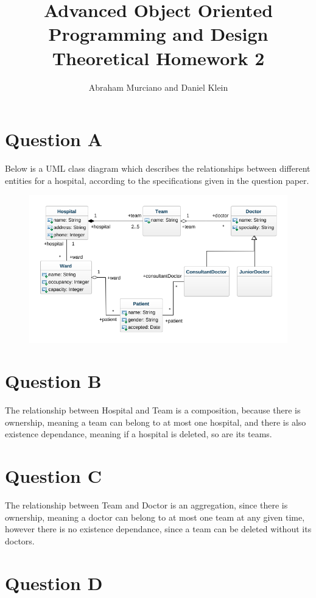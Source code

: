 \documentclass{article}
\title{Advanced Object Oriented Programming and Design\\
\medskip
\large Theoretical Homework 2}
\author{Abraham Murciano and Daniel Klein}
\begin{document}
\maketitle

\section*{Question A}

Below is a UML class diagram which describes the relationships between different entities for a hospital, according to the specifications given in the question paper.

\begin{figure}[htbp]
	\centering
	\includegraphics[width=\textwidth]{uml.png}
\end{figure}

\section*{Question B}

The relationship between Hospital and Team is a composition, because there is ownership, meaning a team can belong to at most one hospital, and there is also existence dependance, meaning if a hospital is deleted, so are its teams.

\section*{Question C}

The relationship between Team and Doctor is an aggregation, since there is ownership, meaning a doctor can belong to at most one team at any given time, however there is no existence dependance, since a team can be deleted without its doctors.

\section*{Question D}
\end{document}
